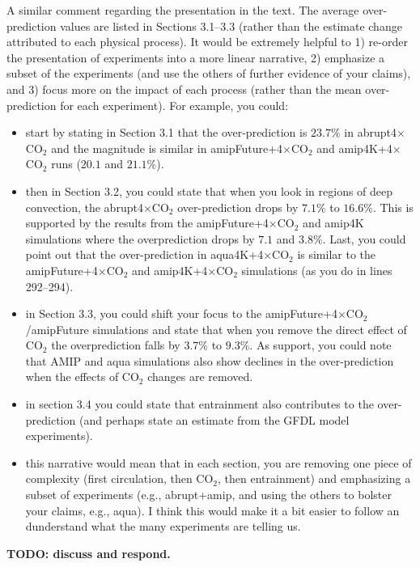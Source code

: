 \documentclass[11pt]{article}
\begin{document}
A similar comment regarding the presentation in the text. The average over-prediction values are listed in Sections 3.1--3.3 (rather than the estimate change attributed to each physical process). It would be extremely helpful to 1) re-order the presentation of experiments into a more linear narrative, 2) emphasize a subset of the experiments (and use the others of further evidence of your claims), and 3) focus more on the impact of each process (rather than the mean over-prediction for each experiment). For example, you could:
\begin{itemize}
\item start by stating in Section 3.1 that the over-prediction is \(23.7\%\) in abrupt4\(\times\)CO\(_2\) and the magnitude is similar in amipFuture+4\(\times\)CO\(_2\) and amip4K+4\(\times\)CO\(_2\) runs (\(20.1\) and \(21.1\%\)).
\item then in Section 3.2, you could state that when you look in regions of deep convection, the abrupt4\(\times\)CO\(_2\) over-prediction drops by \(7.1\%\) to \(16.6\%\). This is supported by the results from the amipFuture+4\(\times\)CO\(_2\) and amip4K simulations where the overprediction drops by \(7.1\) and \(3.8\%\). Last, you could point out that the over-prediction in aqua4K+4\(\times\)CO\(_2\) is similar to the amipFuture+4\(\times\)CO\(_2\) and amip4K+4\(\times\)CO\(_2\) simulations (as you do in lines 292--294).
\item in Section 3.3, you could shift your focus to the amipFuture+4\(\times\)CO\(_2\)/amipFuture simulations and state that when you remove the direct effect of CO\(_2\) the overprediction falls by \(3.7\%\) to \(9.3\%\). As support, you could note that AMIP and aqua simulations also show declines in the over-prediction when the effects of CO\(_2\) changes are removed.
\item in section 3.4 you could state that entrainment also contributes to the over-prediction (and perhaps state an estimate from the GFDL model experiments).
\item this narrative would mean that in each section, you are removing one piece of complexity (first circulation, then CO\(_2\), then entrainment) and emphasizing a subset of experiments (e.g., abrupt+amip, and using the others to bolster your claims, e.g., aqua). I think this would make it a bit easier to follow an dunderstand what the many experiments are telling us.
\end{itemize}

\textbf{TODO: discuss and respond.}
\end{document}
